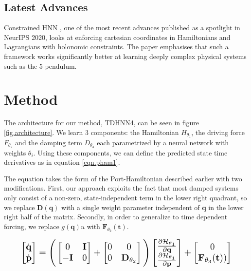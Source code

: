 \documentclass[twoside]{article}
\begin{document}
\subsection{Latest Advances}
Constrained HNN \cite{finzi_generalizing_2020}, one of the most recent advances published as a spotlight in NeurIPS 2020, looks at enforcing cartesian coordinates in Hamiltonians and Lagrangians with holonomic constraints. The paper emphasises that such a framework works significantly better at learning deeply complex physical systems such as the 5-pendulum. 


\section{Method}

The architecture for our method, TDHNN4, can be seen in figure \ref{fig.architecture}. We learn 3 components: the Hamiltonian $H_{\theta_1}$, the driving force $F_{\theta_2}$ and the damping term $D_{\theta_3}$ each parametrized by a neural network with weights $\theta_i$. Using these components, we can define the predicted state time derivatives as in equation \ref{eqn.pham1}.

The equation takes the form of the Port-Hamiltonian described earlier with two modifications. First, our approach exploits the fact that most damped systems only consist of a non-zero, state-independent term in the lower right quadrant, so we replace $\mathbf{D}(\mathbf{q})$ with a single weight parameter independent of $\mathbf{q}$ in the lower right half of the matrix. Secondly, in order to generalize to time dependent forcing, we replace $g(\mathbf{q})u$ with $\mathbf{F}_{\theta_2}(\mathbf{t})$.

\begin{equation}
\resizebox{0.9\linewidth}{!}{$%
\begin{bmatrix}
\dot{\mathbf{q}} \\
\dot{\mathbf{p}}
\end{bmatrix}
=
\Bigg(\begin{bmatrix}
0 & \mathbf{I} \\
-\mathbf{I} & 0
\end{bmatrix} +
\begin{bmatrix}
0 & 0 \\
0 & \mathbf{D}_{\theta_2}
\end{bmatrix}
 \Bigg)
 \begin{bmatrix}
\frac{\partial \mathcal{H}_{\theta_1}}{\partial \mathbf{q}} \\
\frac{\partial \mathcal{H}_{\theta_1}}{\partial \mathbf{p}}
\end{bmatrix}
+
\begin{bmatrix}
0 \\
\mathbf{F}_{\theta_3}(\mathbf{t}))
\end{bmatrix}
$%
}%
\label{eqn.pham1}
\end{equation}
\end{document}
